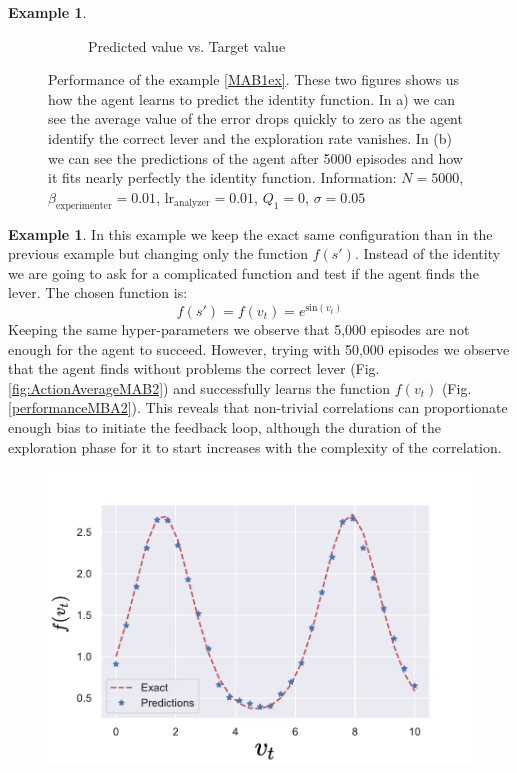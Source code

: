 \documentclass[11pt,a4paper,twoside]{report}
\newcommand{\+}{\textnormal{+} }
\theoremstyle{definition}
\newtheorem{myex}[mythm]{Example}
\numberwithin{equation}{chapter}
\begin{document}
\begin{myex}
\begin{figure}[]
\begin{subfigure}{.5\textwidth}
        \caption{Predicted value vs. Target value}
        \label{fig:predictionsMAB1}
      \end{subfigure}
      \caption{Performance of the example \ref{MAB1ex}. These two figures shows
      us how the agent learns to predict the identity function. In a) we can see
      the average value of the error drops quickly to zero as the agent identify
      the correct lever and the exploration rate vanishes. In (b) we can see the
      predictions of the agent after 5000 episodes and how it fits nearly
      perfectly the identity function. Information: $N=5000$,
      $\beta_\text{experimenter}=0.01$, $\text{lr}_\text{analyzer}=0.01$,
      $Q_1=0$, $\sigma=0.05$}
    \end{figure} 
  \end{myex}
  \begin{myex} \label{MAB2ex}
    In this example we keep the exact same configuration than in the previous
    example but changing only the function $f(s')$. Instead of 
    the identity we are going to ask for a complicated function and test if the
    agent finds the lever. The chosen function is:
    \begin{equation}
      f(s')=f(v_t)= e^{\text{sin}(v_t)}
    \end{equation}
    Keeping the same hyper-parameters we observe that 5,000 episodes are not
    enough for the agent to succeed. However, trying with 50,000 episodes we
    observe that the agent finds without problems the correct lever (Fig.
    \ref{fig:ActionAverageMAB2}) and successfully learns the function $f(v_t)$
    (Fig. \ref{performanceMBA2}). This reveals that non-trivial correlations can
    proportionate enough bias to initiate the feedback loop, although the
    duration of the exploration phase for it to start increases 
    with the complexity of the correlation.


    \begin{figure}
      \centering
      \includegraphics[scale=0.5]{figures/performanceMBA2 edited.pdf}


\end{figure}
\end{myex}
\end{document}

